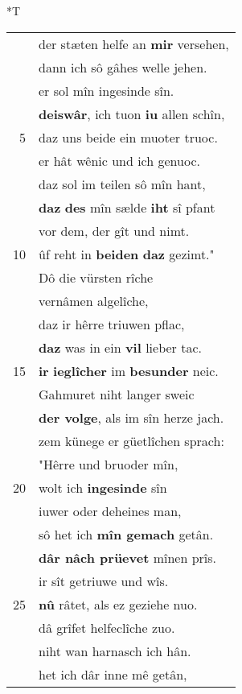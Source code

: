 \documentclass[8pt,a4paper,notitlepage]{article}
\begin{document}
\begin{table}[ht]
\begin{minipage}[t]{0.5\linewidth}
\end{minipage}
\hspace{0.5cm}
\begin{minipage}[t]{0.5\linewidth}
\small
\begin{center}*T
\end{center}
\begin{tabular}{rl}
 & der stæten helfe an \textbf{mir} versehen,\\ 
 & dann ich sô gâhes welle jehen.\\ 
 & er sol mîn ingesinde sîn.\\ 
 & \textbf{deiswâr}, ich tuon \textbf{iu} allen schîn,\\ 
5 & daz uns beide ein muoter truoc.\\ 
 & er hât wênic und ich genuoc.\\ 
 & daz sol im teilen sô mîn hant,\\ 
 & \textbf{daz} \textbf{des} mîn sælde \textbf{iht} sî pfant\\ 
 & vor dem, der gît und nimt.\\ 
10 & ûf reht in \textbf{beiden} \textbf{daz} gezimt."\\ 
 & Dô die vürsten rîche\\ 
 & vernâmen algelîche,\\ 
 & daz ir hêrre triuwen pflac,\\ 
 & \textbf{daz} was in ein \textbf{vil} lieber tac.\\ 
15 & \textbf{ir} \textbf{ieglîcher} im \textbf{besunder} neic.\\ 
 & Gahmuret niht langer sweic\\ 
 & \textbf{der volge}, als im sîn herze jach.\\ 
 & zem künege er güetlîchen sprach:\\ 
 & "Hêrre und bruoder mîn,\\ 
20 & wolt ich \textbf{ingesinde} sîn\\ 
 & iuwer oder deheines man,\\ 
 & sô het ich \textbf{mîn gemach} getân.\\ 
 & \textbf{dâr nâch prüevet} mînen prîs.\\ 
 & ir sît getriuwe und wîs.\\ 
25 & \textbf{nû} râtet, als ez geziehe nuo.\\ 
 & dâ grîfet helfeclîche zuo.\\ 
 & niht wan harnasch ich hân.\\ 
 & het ich dâr inne mê getân,\\ 

\end{tabular}
\end{minipage}
\end{table}
\end{document}
